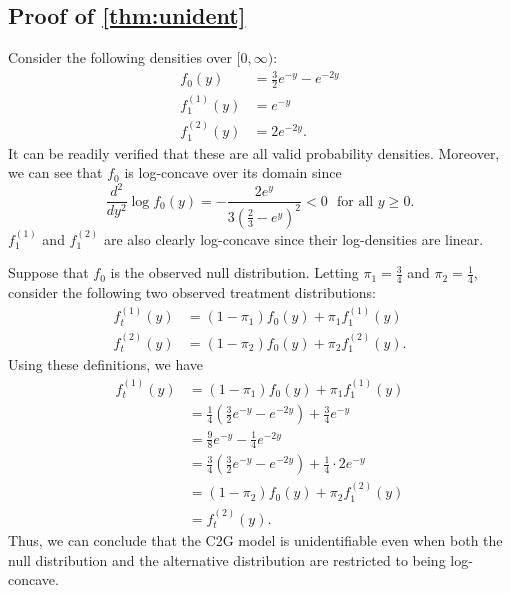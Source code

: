 \subsection{Proof of \cref{thm:unident}}
Consider the following densities over $[0,\infty)$: 
\begin{align*}
    f_0(y) &= \frac{3}{2} e^{-y} - e^{-2y}\\
    f^{(1)}_1(y) &= e^{-y} \\
    f^{(2)}_1(y) &= 2 e^{-2y}.
\end{align*}
It can be readily verified that these are all valid probability densities. Moreover, we can see that $f_0$ is log-concave over its domain since
\[ \frac{d^2}{d y^2} \log f_0(y) = -\frac{2e^y}{3(\frac{2}{3} - e^y)^2} < 0 \, \, \text{ for all 
 } y \geq 0. \]
$f^{(1)}_1$ and $f^{(2)}_1$ are also clearly log-concave since their log-densities are linear.


Suppose that $f_0$ is the observed null distribution. Letting $\pi_1 = \frac{3}{4}$ and $\pi_2 = \frac{1}{4}$, consider the following two observed treatment distributions:
\begin{align*}
f^{(1)}_t(y) &= (1-\pi_1) f_0(y) + \pi_1 f^{(1)}_1(y) \\
f^{(2)}_t(y) &= (1-\pi_2) f_0(y) + \pi_2 f^{(2)}_1(y).
\end{align*}
Using these definitions, we have
\begin{align*}
f^{(1)}_t(y) &= (1-\pi_1) f_0(y) + \pi_1 f^{(1)}_1(y) \\
&= \frac{1}{4} \left( \frac{3}{2} e^{-y} - e^{-2y} \right) + \frac{3}{4} e^{-y} \\
&= \frac{9}{8} e^{-y} - \frac{1}{4} e^{-2y} \\
&= \frac{3}{4} \left( \frac{3}{2} e^{-y} - e^{-2y} \right) + \frac{1}{4} \cdot 2 e^{-y} \\
&= (1-\pi_2) f_0(y) + \pi_2 f^{(2)}_1(y) \\
&= f^{(2)}_t(y).
\end{align*}
Thus, we can conclude that the C2G model is unidentifiable even when both the null distribution and the alternative distribution are restricted to being log-concave.
